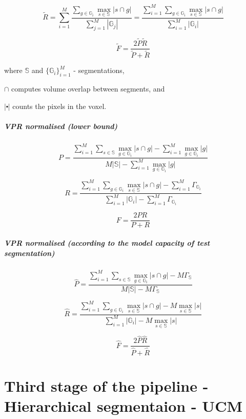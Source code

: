 \[
\tilde{R}=\sum\limits _{i=1}^{M}\frac{\sum\limits _{g\in\mathbb{G}_{i}}\max\limits _{s\in\mathbb{S}}\left|s\cap g\right|}{\sum\limits _{j=1}^{M}\left|\mathbb{G}_{j}\right|}=\frac{\sum\limits _{i=1}^{M}\sum\limits _{g\in\mathbb{G}_{i}}\max\limits _{s\in\mathbb{S}}\left|s\cap g\right|}{\sum\limits _{i=1}^{M}\left|\mathbb{G}_{i}\right|}
\]


\[
\tilde{F}=\frac{2\tilde{P}\tilde{R}}{\tilde{P}+\tilde{R}}
\]

where $\mathbb{S}$ and $\{\mathbb{G}_{i}\}_{i=1}^{M}$ - segmentations,

$\cap$ computes volume overlap between segments, and 

$\left|\centerdot\right|$ counts the pixels in the voxel.

\subparagraph*{VPR normalised (lower bound)}

\[
P=\frac{\sum\limits _{i=1}^{M}\sum\limits _{s\in\mathbb{S}}\max\limits _{g\in\mathbb{G}_{i}}\left|s\cap g\right|-\boxed{\sum\limits _{i=1}^{M}\max\limits _{g\in\mathbb{G}_{i}}\left|g\right|}}{M\left|\mathbb{S}\right|-\boxed{\sum\limits _{i=1}^{M}\max\limits _{g\in\mathbb{G}_{i}}\left|g\right|}}
\]

\[
R=\frac{\sum\limits _{i=1}^{M}\sum\limits _{g\in\mathbb{G}_{i}}\max\limits _{s\in\mathbb{S}}\left|s\cap g\right|-\boxed{\sum\limits _{i=1}^{M}\Gamma_{\mathbb{G}_{i}}}}{\sum\limits _{i=1}^{M}\left|\mathbb{G}_{i}\right|-\boxed{\sum\limits _{i=1}^{M}\Gamma_{\mathbb{G}_{i}}}}
\]

\[
F=\frac{2PR}{P+R}
\]


\subparagraph*{VPR normalised (according to the model capacity of test segmentation)} %

\[
\hat{P}=\frac{\sum\limits _{i=1}^{M}\sum\limits _{s\in\mathbb{S}}\max\limits _{g\in\mathbb{G}_{i}}\left|s\cap g\right|-\boxed{M\Gamma_{\mathbb{S}}}}{M\left|\mathbb{S}\right|-\boxed{M\Gamma_{\mathbb{S}}}}
\]

\[
\hat{{R}}=\frac{\sum\limits _{i=1}^{M}\sum\limits _{g\in\mathbb{G}_{i}}\max\limits _{s\in\mathbb{S}}\left|s\cap g\right|-\boxed{M\max_{s\in\mathbb{S}}\left|s\right|}}{\sum\limits _{i=1}^{M}\left|\mathbb{G}_{i}\right|-\boxed{M\max_{s\in\mathbb{S}}\left|s\right|}}
\]

\[
\hat{{F}}=\frac{2\hat{P}\hat{R}}{\hat{P}+\hat{R}}
\]

\section{Third stage of the pipeline - Hierarchical segmentaion - UCM}

